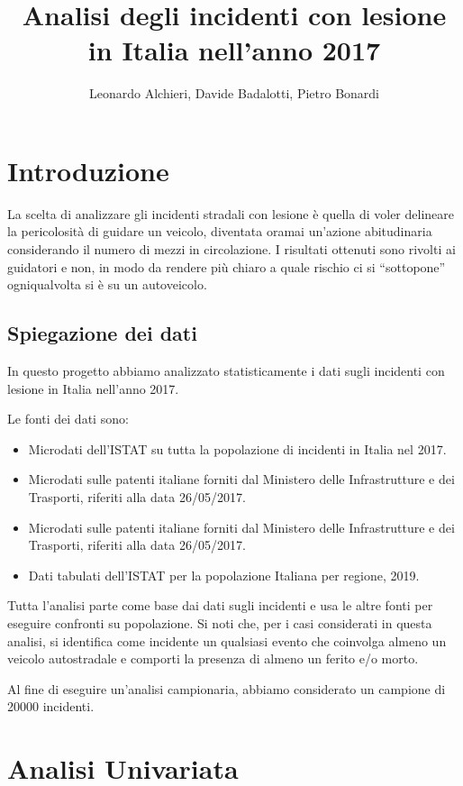 \documentclass[12pt,a4paper,final,oneside]{article}			%
\author{Leonardo Alchieri, Davide Badalotti, Pietro Bonardi}
\title{Analisi degli incidenti con lesione in Italia nell’anno 2017}
\newcommand\blankpage{%
    \null
    \thispagestyle{empty}%
    \addtocounter{page}{-1}%
    \newpage}
\begin{document}
\begin{titlepage}
	
\end{titlepage}
\blankpage{}
\tableofcontents{}
\clearpage

\section{Introduzione}
	La scelta di analizzare gli incidenti stradali con lesione è quella di voler delineare la pericolosità di guidare un veicolo, diventata oramai un’azione abitudinaria considerando il numero di mezzi in circolazione. I risultati ottenuti sono rivolti ai guidatori e non, in modo da rendere più chiaro a quale rischio ci si “sottopone” ogniqualvolta si è su un autoveicolo. 
	
	\subsection{Spiegazione dei dati}
	In questo progetto abbiamo analizzato statisticamente i dati sugli incidenti  con lesione in Italia nell'anno 2017.
	
	Le fonti dei dati sono:
	\begin{itemize}
		\item Microdati dell'ISTAT su tutta la popolazione di incidenti in Italia nel 2017.
        \item Microdati sulle patenti italiane forniti dal Ministero delle Infrastrutture e dei Trasporti, riferiti alla data 26/05/2017.
        \item Microdati sulle patenti italiane forniti dal Ministero delle Infrastrutture e dei Trasporti, riferiti alla data 26/05/2017.
        \item Dati tabulati dell'ISTAT per la popolazione Italiana per regione, 2019.
	\end{itemize}	
    Tutta l'analisi parte come base dai dati sugli incidenti e usa le altre fonti per eseguire confronti su popolazione. Si noti che, per i casi considerati in questa analisi, si identifica come incidente un qualsiasi evento che coinvolga almeno un veicolo autostradale e comporti la presenza di almeno un ferito e/o morto.
    
    Al fine di eseguire un'analisi campionaria, abbiamo considerato un campione di 20000 incidenti.

\clearpage

\section{Analisi Univariata}
\end{document}
